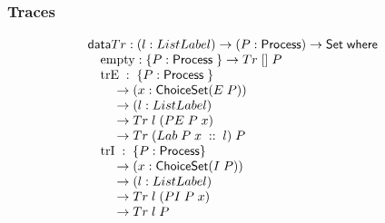 \documentclass{beamer}
\newcommand{\ar}{\rightarrow}
\newcommand{\datarm}{\mathsf{data}}
\newcommand{\wheresf}{\mathsf{where}}
\newcommand{\Set}{\mathsf{Set}}
\newcommand{\Process}{\mathsf{Process}}
\newcommand{\ChoiceSet}{\mathsf{ChoiceSet}}
\newcommand{\emptyC}{\mathrm{empty}}
\newcommand{\extChoice}{\mathrm{trE}}
\newcommand{\intChoice}{\mathrm{trI}}
\begin{document}
%
%
%


\begin{frame}
\frametitle{Traces}

\[\begin{array}[t]{@{}lcl} 
\datarm Tr  : (l : List Label)\ar (P : \Process ) \ar \Set \;  \wheresf \\

\mbox{\quad} \emptyC : \{ P : \Process \; \} \ar Tr \; [] \; P \\
\mbox{\quad}\extChoice \; : \; \{ P : \Process \; \} \\
\mbox{\quad}\mbox{\quad} \ar  (x : \ChoiceSet (E \; P )) \\
\mbox{\quad}\mbox{\quad} \ar (l : List Label)\\
\mbox{\quad}\mbox{\quad} \ar Tr \; l \; (PE\; P \; x) \\
\mbox{\quad}\mbox{\quad} \ar Tr\; (Lab\; P\; x\; ::\; l)\; P\\
\mbox{\quad}\intChoice \; : \; \{ P : \Process  \} \\
\mbox{\quad}\mbox{\quad} \ar  (x : \ChoiceSet (I  \; P)) \\
\mbox{\quad}\mbox{\quad} \ar (l : List Label)\\
\mbox{\quad}\mbox{\quad} \ar Tr \; l \; (PI\; P\; x) \\
\mbox{\quad}\mbox{\quad} \ar Tr\;l \; P\\

\end{array} \]

\end{frame}
\end{document}
